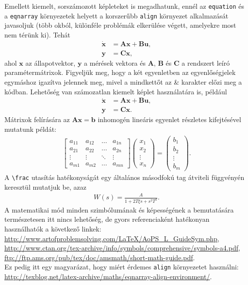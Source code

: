Emellett kiemelt, sorszámozott képleteket is megadhatunk, ennél az \verb+equation+ és a \verb+eqnarray+ környezetek helyett a korszerűbb \verb+align+ környezet alkalmazását javasoljuk (több okból, különféle problémák elkerülése végett, amelyekre most nem térünk ki). Tehát
\begin{align}
\dot{\mathbf{x}}&=\mathbf{A}\mathbf{x}+\mathbf{B}\mathbf{u},\\
\mathbf{y}&=\mathbf{C}\mathbf{x},
\end{align}
ahol $\mathbf{x}$ az állapotvektor, $\mathbf{y}$ a mérések vektora és $\mathbf{A}$, $\mathbf{B}$ és $\mathbf{C}$ a rendszert leíró paramétermátrixok. Figyeljük meg, hogy a két egyenletben az egyenlőségjelek egymáshoz igazítva jelennek meg, mivel a mindkettőt az \& karakter előzi meg a kódban. Lehetőség van számozatlan kiemelt képlet használatára is, például
\begin{align}
\dot{\mathbf{x}}&=\mathbf{A}\mathbf{x}+\mathbf{B}\mathbf{u},\nonumber\\
\mathbf{y}&=\mathbf{C}\mathbf{x}\nonumber.
\end{align}
Mátrixok felírására az $\mathbf{A}\mathbf{x}=\mathbf{b}$ inhomogén lineáris egyenlet részletes kifejtésével mutatunk példát:
\begin{align}
\begin{bmatrix}
a_{11} & a_{12} & \dots & a_{1n}\\
a_{21} & a_{22} & \dots & a_{2n}\\
\vdots & \vdots & \ddots & \vdots\\
a_{m1} & a_{m2} & \dots & a_{mn}
\end{bmatrix}
\begin{pmatrix}x_1\\x_2\\\vdots\\x_n\end{pmatrix}=
\begin{pmatrix}b_1\\b_2\\\vdots\\b_m\end{pmatrix}.
\end{align}
A \verb+\frac+ utasítás hatékonyságát egy általános másodfokú tag átviteli függvényén keresztül mutatjuk be, azaz
\begin{align}
W(s)=\frac{A}{1+2T\xi s+s^2T^2}.
\end{align}
A matematikai mód minden szimbólumának és képességének a bemutatására természetesen itt nincs lehetőség, de gyors referenciaként hatékonyan használhatók a következő linkek:\\
\indent\url{http://www.artofproblemsolving.com/LaTeX/AoPS_L_GuideSym.php},\\
\indent\url{http://www.ctan.org/tex-archive/info/symbols/comprehensive/symbols-a4.pdf},\\
\indent\url{ftp://ftp.ams.org/pub/tex/doc/amsmath/short-math-guide.pdf}.\\
Ez pedig itt egy magyarázat, hogy miért érdemes \verb+align+ környezetet használni:\\
\indent\url{http://texblog.net/latex-archive/maths/eqnarray-align-environment/}.

